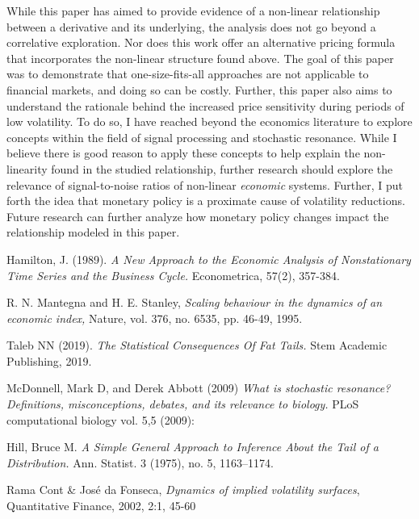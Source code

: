 \documentclass[11pt,a4paper,oldfontcommands]{memoir}
\begin{document}
{While this paper has aimed to provide evidence of a non-linear relationship between a derivative and its underlying, the analysis does not go beyond a correlative exploration. Nor does this work offer an alternative pricing formula that incorporates the non-linear structure found above. The goal of this paper was to demonstrate that one-size-fits-all approaches are not applicable to financial markets, and doing so can be costly. Further, this paper also aims to understand the rationale behind the increased price sensitivity during periods of low volatility. To do so, I have reached beyond the economics literature to explore concepts within the field of signal processing and stochastic resonance. While I believe there is good reason to apply these concepts to help explain the non-linearity found in the studied relationship, further research should explore the relevance of signal-to-noise ratios of non-linear \textit{economic} systems. Further, I put forth the idea that monetary policy is a proximate cause of volatility reductions. Future research can further analyze how monetary policy changes impact the relationship modeled in this paper. 





\begin{thebibliography}{53}

Hamilton, J. (1989). \textit{A New Approach to the Economic Analysis of Nonstationary Time Series and the Business Cycle.} Econometrica, 57(2), 357-384.

R. N. Mantegna and H. E. Stanley, \textit{Scaling behaviour in the dynamics of an economic index,} Nature, vol. 376, no. 6535, pp. 46-49, 1995. 

Taleb NN (2019). \textit{The Statistical Consequences Of Fat Tails.} Stem Academic Publishing, 2019.

McDonnell, Mark D, and Derek Abbott (2009) \textit{What is stochastic resonance? Definitions, misconceptions, debates, and its relevance to biology.} PLoS computational biology vol. 5,5 (2009):

Hill, Bruce M. \textit{A Simple General Approach to Inference About the Tail of a Distribution.} Ann. Statist. 3 (1975), no. 5, 1163--1174.

Rama Cont & José da Fonseca, \textit{Dynamics of implied volatility surfaces}, Quantitative Finance, 2002, 2:1, 45-60


\end{thebibliography}}
\end{document}
